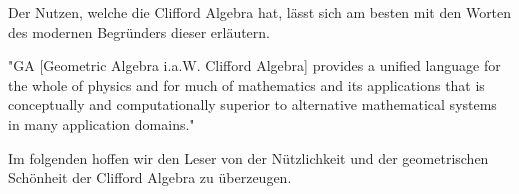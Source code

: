 
Der Nutzen, welche die Clifford Algebra hat, lässt sich am besten mit den Worten des modernen Begründers dieser erläutern.

"GA [Geometric Algebra i.a.W. Clifford Algebra] provides a unified language for the whole of physics and for much of mathematics and its applications that is conceptually and computationally superior to alternative mathematical systems in many application domains." \cite{clifford:hestenes_GA} 

Im folgenden hoffen wir den Leser von der Nützlichkeit und der geometrischen Schönheit der Clifford Algebra zu überzeugen.